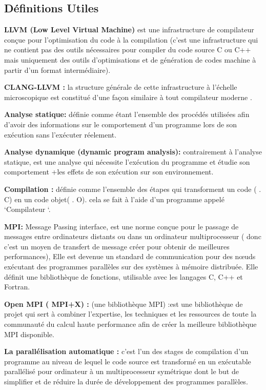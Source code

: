 \documentclass[12pt,titlepage]{article}
\begin{document}
\subsection{Définitions Utiles} 
	

\textbf{ LLVM (Low Level Virtual Machine)} est une infrastructure de compilateur conçue pour l'optimisation du code à la compilation (c’est une infrastructure qui ne contient pas des outils nécessaires pour compiler du code source C ou C++ mais uniquement des outils d’optimisations et de génération de codes machine à partir d’un format intermédiaire).\cite{clangllvm}
              
\textbf{CLANG-LLVM :} la structure générale de cette infrastructure à l’échelle microscopique est constitué d’une façon similaire à tout compilateur moderne .\cite{clangllvm}

\textbf{ Analyse statique:} définie comme étant l'ensemble des procédés utilisées afin d'avoir des informations sur le comportement d’un programme lors de son exécution sans l’exécuter réelement.\cite{wiki}

\textbf{  Analyse dynamique (dynamic program analysis): } contrairement à l’analyse statique, est une analyse qui nécessite l’exécution du programme et étudie son comportement +les effets de son exécution sur son environnement.\cite{wiki}

\textbf{ Compilation : } définie comme l’ensemble des étapes qui transforment un code ( . C) en un code objet( . O). cela se fait à l’aide d’un programme appelé ‘Compilateur ‘.\cite{wiki}

\textbf{ MPI:} Message Passing interface, est une norme conçue pour le passage de messages entre ordinateurs distants ou dans un ordinateur multiprocesseur ( donc c’est un moyen de transfert de message créer pour obtenir de meilleures performances), Elle est devenue un standard de communication pour des nœuds exécutant des programmes parallèles sur des systèmes à mémoire distribuée. Elle définit une bibliothèque de fonctions, utilisable avec les langages C, C++ et Fortran.\cite{wiki}

\textbf{ Open MPI ( MPI+X) :} (une bibliothèque MPI) :est une bibliothèque de projet qui sert à combiner l'expertise, les techniques et les ressources de toute la communauté du calcul haute performance afin de créer la meilleure bibliothèque MPI disponible.\cite{wiki}


\textbf{ La parallélisation automatique :} c’est l’un des stages de compilation d’un programme au niveau de lequel le code source est transformé  en un exécutable parallélisé pour ordinateur à un multiprocesseur symétrique dont le but de simplifier et de réduire la durée de développement des programmes parallèles.\cite{wiki}
\end{document}
